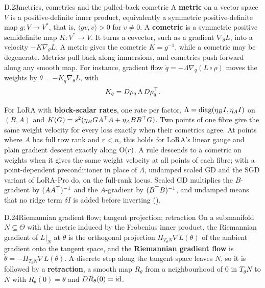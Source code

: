 
\begin{bgentry}{D.23}{metrics, cometrics and the pulled-back cometric}
A \textbf{metric} on a vector space $V$ is a positive-definite inner product, equivalently a symmetric positive-definite
map $g:V\to V^*$, that is, $\langle gv,v\rangle>0$ for $v\ne0$. A \textbf{cometric} is a symmetric positive semidefinite
map $K:V^*\to V$. It turns a covector, such as a gradient $\nabla_\theta L$, into a velocity $-K\nabla_\theta L$. A
metric gives the cometric $K=g^{-1}$, while a cometric may be degenerate. Metrics pull back along immersions, and
cometrics push forward along any smooth map. For instance, gradient flow $\dot q=-\Lambda\nabla_q(L\circ\rho)$ moves the
weights by $\dot\theta=-K_q\nabla_\theta L$, with
\[K_q=D\rho_q\,\Lambda\,D\rho_q^{\top}.\]
\end{bgentry}

For LoRA with \textbf{block-scalar rates}, one rate per factor, $\Lambda=\operatorname{diag}(\eta_BI,\eta_AI)$ on $(B,A)$ and
$K(G)=s^2(\eta_BGA^{\top} A+\eta_ABB^{\top} G)$. Two points of one fibre give the same weight velocity for every loss exactly when
their cometrics agree. At points where $A$ has full row rank and $r<n$, this holds for LoRA's linear gauge and plain
gradient descent exactly along $\mathrm{O}(r)$. A rule descends to a cometric on weights when it gives the same weight
velocity at all points of each fibre; with a point-dependent preconditioner in place of $\Lambda$, undamped scaled GD
\citep{xtong2021accelerating,zhang2024riemannian} and the SGD variant of LoRA-Pro \citep{wang2024lorac} do, on the
full-rank locus. Scaled GD multiplies the $B$-gradient by $(AA^{\top})^{-1}$ and the $A$-gradient by $(B^{\top} B)^{-1}$, and
undamped means that no ridge term $\delta I$ is added before inverting ().


\begin{bgentry}{D.24}{Riemannian gradient flow; tangent projection; retraction}
On a submanifold $N\subseteq\Theta$ with the metric induced by the Frobenius inner product, the Riemannian gradient of
$L|_N$ at $\theta$ is the orthogonal projection $\Pi_{T_\theta N}\nabla L(\theta)$ of the ambient gradient onto the
tangent space, and the \textbf{Riemannian gradient flow} is $\dot\theta=-\Pi_{T_\theta N}\nabla L(\theta)$. A discrete
step along the tangent space leaves $N$, so it is followed by a \textbf{retraction}, a smooth map $R_\theta$ from a
neighbourhood of $0$ in $T_\theta N$ to $N$ with $R_\theta(0)=\theta$ and $DR_\theta(0)=\mathrm{id}$.
\end{bgentry}

